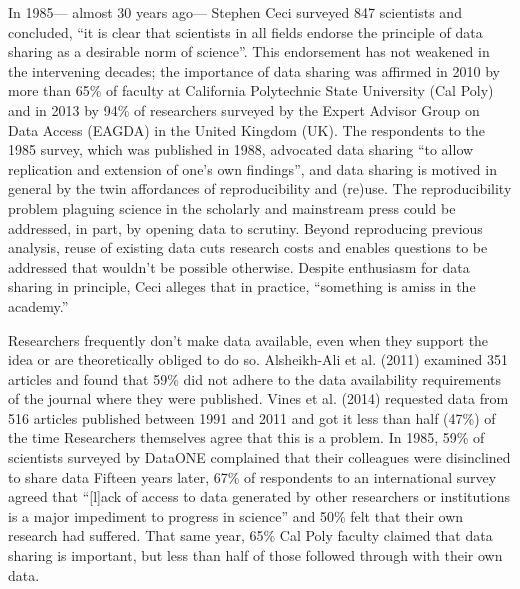 \documentclass[10pt]{article}
\begin{document}
In 1985--- almost 30 years ago--- Stephen Ceci surveyed 847 scientists and concluded, ``it is clear that scientists in all fields endorse the principle of data sharing as a desirable norm of science''\cite{ceci_scientists_1988}.
This endorsement has not weakened in the intervening decades; the importance of data sharing was affirmed in 2010 by more than 65\% of faculty at California Polytechnic State University (Cal Poly)\cite{scaramozzino_study_2012} and in 2013 by 94\% of researchers surveyed by the Expert Advisor Group on Data Access (EAGDA) in the United Kingdom (UK)\cite{bobrow_establishing_2014}.
The respondents to the 1985 survey, which was published in 1988, advocated data sharing ``to allow replication and extension of one's own findings''\cite{ceci_scientists_2014}, and data sharing is motived in general by the twin affordances of reproducibility and (re)use.
The reproducibility problem plaguing science in the scholarly\cite{ioannidis_why_2005, prinz_believe_2011, mobley_survey_2013} and mainstream\cite{zimmer_rise_2013, _how_2013, _trouble_2013} press could be addressed, in part, by opening data to scrutiny\cite{drew_lost_2013, collins_policy_2014}.
Beyond reproducing previous analysis, reuse of existing data cuts research costs\cite{piwowar_data_2011} and enables questions to be addressed that wouldn't be possible otherwise\cite{FIND_SOMETHING}.
Despite enthusiasm for data sharing in principle, Ceci alleges that in practice, ``something is amiss in the academy.''

Researchers frequently don't make data available, even when they support the idea or are theoretically obliged to do so.
Alsheikh-Ali et al. (2011) examined 351 articles and found that 59\% did not adhere to the data availability requirements of the journal where they were published.
Vines et al. (2014) requested data from 516 articles published between 1991 and 2011 and got it less than half (47\%) of the time\cite{vines_availability_2014}
Researchers themselves agree that this is a problem.
In 1985, 59\% of scientists surveyed by DataONE complained that their colleagues were disinclined to share data\cite{ceci_scientists_1988}
Fifteen years later, 67\% of respondents to an international survey agreed that ``[l]ack of access to data generated by other researchers or institutions is a major impediment to progress in science'' and 50\% felt that their own research had suffered\cite{tenopir_data_2011}.
That same year, 65\% Cal Poly faculty claimed that data sharing is important, but less than half of those followed through with their own data\cite{scaramozzino_study_2012}.
\end{document}
